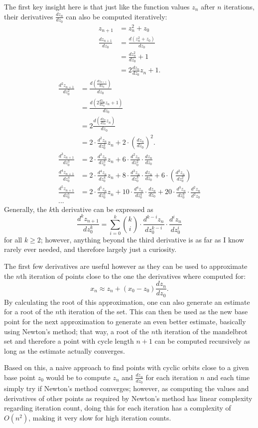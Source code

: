 \documentclass[12pt,a4paper]{article}
\newcommand{\eqar}[1]{\begin{align*} #1 \end{align*}}
\begin{document}
The first key insight here is that just like the function values $z_n$ after $n$ iterations, their derivatives $\frac{dz_n}{dz_0}$ can also be computed iteratively:
\eqar{
	z_{n+1} &= z_n^2+z_0\\
	\frac{dz_{n+1}}{dz_0} &= \frac{d(z_n^2+z_0)}{dz_0}\\
	&= \frac{dz_n^2}{dz_0}+1\\
	&= 2\frac{dz_n}{dz_0}z_n+1.
}
\eqar{
	\frac{d^2z_{n+1}}{dz_0^2} &= \frac{d(\frac{dz_{n+1}}{dz_0})}{dz_0}\\
	&= \frac{d(2\frac{dz_n}{dz_0}z_n+1)}{dz_0}\\
	&= 2\frac{d(\frac{dz_n}{dz_0}z_n)}{dz_0}\\
	&= 2\cdot\frac{d^2z_n}{dz_0^2}z_n+2\cdot(\frac{dz_n}{dz_0})^2.\\
	\frac{d^3z_{n+1}}{dz_0^3} &= 2\cdot\frac{d^3z_n}{dz_0^3}z_n+6\cdot\frac{d^2z_n}{dz_0^2}\cdot\frac{dz_n}{dz_0}\\
	\frac{d^4z_{n+1}}{dz_0^4} &= 2\cdot\frac{d^4z_n}{dz_0^4}z_n+8\cdot\frac{d^3z_n}{dz_0^3}\cdot\frac{dz_n}{dz_0}+6\cdot(\frac{d^2z_n}{dz_0^2})\\
	\frac{d^5z_{n+1}}{dz_0^5} &= 2\cdot\frac{d^5z_n}{dz_0^5}z_n+10\cdot\frac{d^4z_n}{dz_0^4}\cdot\frac{dz_n}{dz_0}+20\cdot\frac{d^3z_n}{dz_0^3}\cdot\frac{d^2z_n}{d^2z_0}\\
	...
}
Generally, the $k$th derivative can be expressed as
$$\frac{d^kz_{n+1}}{dz_0^k} = \sum_{i=0}^{k}\binom{k}{i}\cdot\frac{d^{k-i}z_n}{dz_0^{k-i}}\cdot\frac{d^iz_n}{dz_0^i}$$
for all $k\geq2$; however, anything beyond the third derivative is as far as I know rarely ever needed, and therefore largely just a curiosity.

The first few derivatives are useful however as they can be used to approximate the $n$th iteration of points close to the one the derivatives where computed for:
$$x_n \approx z_n+(x_0-z_0)\frac{dz_n}{dz_0}.$$
By calculating the root of this approximation, one can also generate an estimate for a root of the $n$th iteration of the set. This can then be used as the new base point for the next approximation to generate an even better estimate, basically using Newton's method; that way, a root of the $n$th iteration of the mandelbrot set and therefore a point with cycle length $n+1$ can be computed recursively as long as the estimate actually converges.

Based on this, a naive approach to find points with cyclic orbits close to a given base point $z_0$ would be to compute $z_n$ and $\frac{dz_n}{dz_0}$ for each iteration $n$ and each time simply try if Newton's method converges; however, as computing the values and derivatives of other points as required by Newton's method has linear complexity regarding iteration count, doing this for each iteration has a complexity of $O(n^2)$, making it very slow for high iteration counts.
\end{document}
